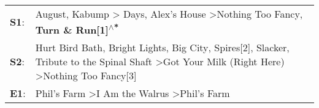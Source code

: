 \begin{supertabular}{p{0.03\textwidth}p{0.92\textwidth}}
 \textbf{S1}:  &                                                                             August\textsuperscript{}, \enspace Kabump\textsuperscript{} \textgreater {} Days\textsuperscript{}, \enspace Alex's House\textsuperscript{} \textgreater \enspace Nothing Too Fancy\textsuperscript{}, \enspace \textbf{Turn \& Run[1]\textsuperscript{$\wedge$*}}  \enspace  \\
 \textbf{S2}:  &  Hurt Bird Bath\textsuperscript{}, \enspace Bright Lights, Big City\textsuperscript{}, \enspace Spires[2]\textsuperscript{}, \enspace Slacker\textsuperscript{}, \enspace Tribute to the Spinal Shaft\textsuperscript{} \textgreater \enspace Got Your Milk (Right Here)\textsuperscript{} \textgreater \enspace Nothing Too Fancy[3]\textsuperscript{}  \enspace  \\
 \textbf{E1}:  &                                                                                                                                                                                                               Phil's Farm\textsuperscript{} \textgreater \enspace I Am the Walrus\textsuperscript{} \textgreater \enspace Phil's Farm\textsuperscript{}  \enspace  \\
\end{supertabular}
